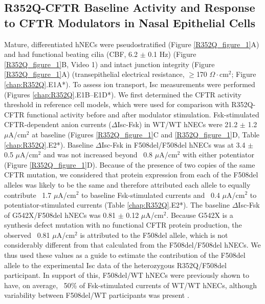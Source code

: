 \subsection{R352Q-CFTR Baseline Activity and Response to CFTR Modulators in Nasal Epithelial Cells}
Mature, differentiated hNECs were pseudostratified (Figure \ref{R352Q_figure_1}A) and had functional beating cilia (CBF, 6.2 $\pm$ 0.1 Hz) (Figure \ref{R352Q_figure_1}B, Video 1) and intact junction integrity (Figure \ref{R352Q_figure_1}A) (transepithelial electrical resistance, $\geq$170 $\Omega\cdot$cm$^2$; Figure \ref{chap:R352Q}.E1A*). To assess ion transport, Isc measurements were performed (Figures \ref{chap:R352Q}.E1B–E1D*). We first determined the CFTR activity threshold in reference cell models, which were used for comparison with R352Q-CFTR functional activity before and after modulator stimulation. Fsk-stimulated CFTR-dependent anion currents ($\Delta$Isc-Fsk) in WT/WT hNECs were 21.2 $\pm$ 1.2 $\mu$A/cm$^2$ at baseline (Figures \ref{R352Q_figure_1}C and \ref{R352Q_figure_1}D, Table \ref{chap:R352Q}.E2*). Baseline $\Delta$Isc-Fsk in F508del/F508del hNECs was at 3.4 $\pm$ 0.5 $\mu$A/cm$^2$ and was not increased beyond ~0.8 $\mu$A/cm$^2$ with either potentiator (Figure \ref{R352Q_figure_1}D). Because of the presence of two copies of the same CFTR mutation, we considered that protein expression from each of the F508del alleles was likely to be the same and therefore attributed each allele to equally contribute ~1.7 $\mu$A/cm$^2$ to baseline Fsk-stimulated currents and ~0.4 $\mu$A/cm$^2$ to potentiator-stimulated currents (Table \ref{chap:R352Q}.E2*). The baseline $\Delta$Isc-Fsk of G542X/F508del hNECs was 0.81 $\pm$ 0.12 $\mu$A/cm$^2$. Because G542X is a synthesis defect mutation with no functional CFTR protein production, the observed ~0.81 $\mu$A/cm$^2$ is attributed to the F508del allele, which is not considerably different from that calculated from the F508del/F508del hNECs. We thus used these values as a guide to estimate the contribution of the F508del allele to the experimental Isc data of the heterozygous R352Q/F508del participant. In support of this, F508del/WT hNECs were previously shown to have, on average, ~50\% of Fsk-stimulated currents of WT/WT hNECs, although variability between F508del/WT participants was present \cite{pranke2017}.


